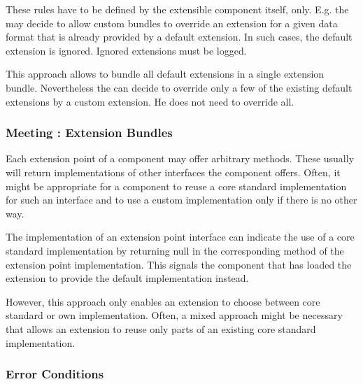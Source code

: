 These rules have to be defined by the extensible component itself, only. E.g. the \COMPdataFormatManagement{} may decide to allow custom bundles to override an extension for a given data format that is already provided by a default extension. In such cases, the default extension is ignored. Ignored extensions must be logged.

This approach allows to bundle all \LibName{} default extensions in a single extension bundle. Nevertheless the \ACTORextender{} can decide to override only a few of the existing default extensions by a custom extension. He does not need to override all.


\subsubsection{Meeting \REQUreuseCore{}: Extension Bundles}
\label{sec:REQUreuseCore}

Each extension point of a component may offer arbitrary methods. These usually will return implementations of other interfaces the component offers. Often, it might be appropriate for a component to reuse a \LibName{} core standard implementation for such an interface and to use a custom implementation only if there is no other way.

The implementation of an extension point interface can indicate the use of a \LibName{} core standard implementation by returning null in the corresponding method of the extension point implementation. This signals the component that has loaded the extension to provide the default implementation instead.

However, this approach only enables an extension to choose between core standard or own implementation. Often, a mixed approach might be necessary that allows an extension to reuse only parts of an existing core standard implementation.



\subsubsection{Error Conditions}
\label{sec:ErrorConditions}

